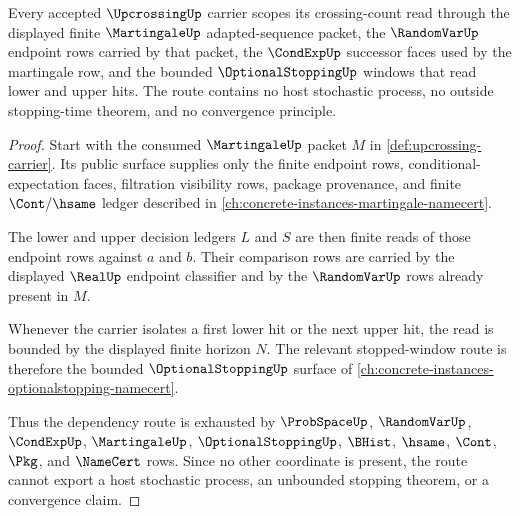 \begin{theorem}
\label{thm:upcrossing-martingale-route}
Every accepted $\UpcrossingUp$ carrier scopes its crossing-count read through the displayed finite $\MartingaleUp$ adapted-sequence packet, the $\RandomVarUp$ endpoint rows carried by that packet, the $\CondExpUp$ successor faces used by the martingale row, and the bounded $\OptionalStoppingUp$ windows that read lower and upper hits. The route contains no host stochastic process, no outside stopping-time theorem, and no convergence principle.
\end{theorem}
\begin{proof}
Start with the consumed $\MartingaleUp$ packet $M$ in \autoref{def:upcrossing-carrier}. Its public surface supplies only the finite endpoint rows, conditional-expectation faces, filtration visibility rows, package provenance, and finite $\Cont/\hsame$ ledger described in \autoref{ch:concrete-instances-martingale-namecert}.

The lower and upper decision ledgers $L$ and $S$ are then finite reads of those endpoint rows against $a$ and $b$. Their comparison rows are carried by the displayed $\RealUp$ endpoint classifier and by the $\RandomVarUp$ rows already present in $M$.

Whenever the carrier isolates a first lower hit or the next upper hit, the read is bounded by the displayed finite horizon $N$. The relevant stopped-window route is therefore the bounded $\OptionalStoppingUp$ surface of \autoref{ch:concrete-instances-optionalstopping-namecert}.

Thus the dependency route is exhausted by $\ProbSpaceUp$, $\RandomVarUp$, $\CondExpUp$, $\MartingaleUp$, $\OptionalStoppingUp$, $\BHist$, $\hsame$, $\Cont$, $\Pkg$, and $\NameCert$ rows. Since no other coordinate is present, the route cannot export a host stochastic process, an unbounded stopping theorem, or a convergence claim.
\end{proof}

